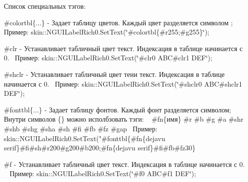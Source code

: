 \begin{DoxyItemize}
 Список специальных тэгов\+: ~\newline
 \item \#colortbl\{...\} -\/ Задает таблицу цветов. Каждый цвет разделяется символом ;~\newline
 Пример\+: skin\+::\+N\+G\+U\+I\+Label\+Rich0.\+Set\+Text(\char`\"{}\#colortbl\{\#r255;\#g255\}\char`\"{});~\newline
 \item \#clr -\/ Устанавливает табличный цвет текст. Индексация в таблице начинается с 0.~\newline
 Пример\+: skin\+::\+N\+G\+U\+I\+Label\+Rich0.\+Set\+Text(\char`\"{}\#clr0 A\+B\+C\#clr1 D\+E\+F\char`\"{});~\newline
 \item \#shclr -\/ Устанавливает табличный цвет тени текст. Индексация в таблице начинается с 0.~\newline
 Пример\+: skin\+::\+N\+G\+U\+I\+Label\+Rich0.\+Set\+Text(\char`\"{}\#shclr0 A\+B\+C\#shclr1 D\+E\+F\char`\"{});~\newline
 \item \#fonttbl\{...\} -\/ Задает таблицу фонтов. Каждый фонт разделяется символом; Внутри символов \{\} можно исполбзовать тэги\+: ~\newline
 \#fn\{имя\} \#r \#b \#g \#a \#shr \#shb \#shg \#sha \#sh \#fi \#fb \#fz \#gap~\newline
 Пример\+:~\newline
 skin\+::\+N\+G\+U\+I\+Label\+Rich0.\+Set\+Text("\#fonttbl\{\#fn\{dejavu serif\}\#fi\#sh\#r200\#g200\#b200;\#fn\{dejavu serif\}\#fi\#fb\#fz30\}~\newline
 \item \#f -\/ Устанавливает табличный цвет текст. Индексация в таблице начинается с 0. ~\newline
 Пример\+: skin\+::\+N\+G\+U\+I\+Label\+Rich0.\+Set\+Text(\char`\"{}\#f0 A\+B\+C\#f1 D\+E\+F\char`\"{});~\newline
\end{DoxyItemize}
